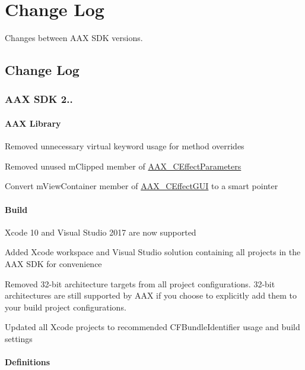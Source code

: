 \hypertarget{a00847}{}\section{Change Log}
\label{a00847}
Changes between A\+AX S\+DK versions. 

\hypertarget{a00847_changelog}{}\subsection{Change Log}\label{a00847_changelog}
\hypertarget{a00847_aax_sdk_2p3p2}{}\subsubsection{A\+A\+X S\+D\+K 2..}\label{a00847_aax_sdk_2p3p2}
\hypertarget{a00847_aax_sdk_2p3p2_AAXLibrary}{}\paragraph{A\+A\+X Library}\label{a00847_aax_sdk_2p3p2_AAXLibrary}

\begin{DoxyItemize}
\item Removed unnecessary {\ttfamily virtual} keyword usage for method overrides  
\item Removed unused {\ttfamily m\+Clipped} member of \mbox{\hyperlink{a01481}{A\+A\+X\+\_\+\+C\+Effect\+Parameters}}  
\item Convert {\ttfamily m\+View\+Container} member of \mbox{\hyperlink{a01477}{A\+A\+X\+\_\+\+C\+Effect\+G\+UI}} to a smart pointer  
\end{DoxyItemize}\hypertarget{a00847_aax_sdk_2p3p2_Build}{}\paragraph{Build}\label{a00847_aax_sdk_2p3p2_Build}

\begin{DoxyItemize}
\item Xcode 10 and Visual Studio 2017 are now supported  
\item Added Xcode workspace and Visual Studio solution containing all projects in the A\+AX S\+DK for convenience  
\item Removed 32-\/bit architecture targets from all project configurations. 32-\/bit architectures are still supported by A\+AX if you choose to explicitly add them to your build project configurations.  
\item Updated all Xcode projects to recommended {\ttfamily C\+F\+Bundle\+Identifier} usage and build settings  
\end{DoxyItemize}\hypertarget{a00847_aax_sdk_2p3p2_Definitions}{}\paragraph{Definitions}\label{a00847_aax_sdk_2p3p2_Definitions}

